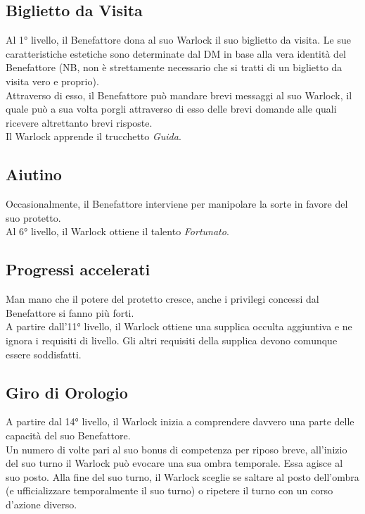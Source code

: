 \subsection{Biglietto da Visita}
Al 1° livello, il Benefattore dona al suo Warlock il suo biglietto da visita. Le sue caratteristiche estetiche sono determinate dal DM in base alla vera identità del Benefattore (NB, non è strettamente necessario che si tratti di un biglietto da visita vero e proprio).\\
Attraverso di esso, il Benefattore può mandare brevi messaggi al suo Warlock, il quale può a sua volta porgli attraverso di esso delle brevi domande alle quali ricevere altrettanto brevi risposte.\\
Il Warlock apprende il trucchetto \textit{Guida}.

\subsection{Aiutino}
Occasionalmente, il Benefattore interviene per manipolare la sorte in favore del suo protetto.\\
Al 6° livello, il Warlock ottiene il talento \textit{Fortunato}.

\subsection{Progressi accelerati}
Man mano che il potere del protetto cresce, anche i privilegi concessi dal Benefattore si fanno più forti.\\
A partire dall'11° livello, il Warlock ottiene una supplica occulta aggiuntiva e ne ignora i requisiti di livello. Gli altri requisiti della supplica devono comunque essere soddisfatti.

\subsection{Giro di Orologio}
A partire dal 14° livello, il Warlock inizia a comprendere davvero una parte delle capacità del suo Benefattore.\\
Un numero di volte pari al suo bonus di competenza per riposo breve, all'inizio del suo turno il Warlock può evocare una sua ombra temporale. Essa agisce al suo posto. Alla fine del suo turno, il Warlock sceglie se saltare al posto dell'ombra (e ufficializzare temporalmente il suo turno) o ripetere il turno con un corso d'azione diverso.

%